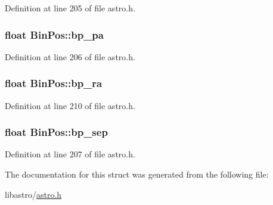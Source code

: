 Definition at line 205 of file astro.\-h.

\hypertarget{struct_bin_pos_a5a2e7d4cb399601758b0c724ce5543d4}{
\subsubsection[{bp\-\_\-pa}]{\setlength{\rightskip}{0pt plus 5cm}float Bin\-Pos\-::bp\-\_\-pa}}\label{struct_bin_pos_a5a2e7d4cb399601758b0c724ce5543d4}


Definition at line 206 of file astro.\-h.

\hypertarget{struct_bin_pos_addd6fc5c935d61f90723a4848e70c86f}{
\subsubsection[{bp\-\_\-ra}]{\setlength{\rightskip}{0pt plus 5cm}float Bin\-Pos\-::bp\-\_\-ra}}\label{struct_bin_pos_addd6fc5c935d61f90723a4848e70c86f}


Definition at line 210 of file astro.\-h.

\hypertarget{struct_bin_pos_aa451101e51c051196ee5cc0f6d846f77}{
\subsubsection[{bp\-\_\-sep}]{\setlength{\rightskip}{0pt plus 5cm}float Bin\-Pos\-::bp\-\_\-sep}}\label{struct_bin_pos_aa451101e51c051196ee5cc0f6d846f77}


Definition at line 207 of file astro.\-h.



The documentation for this struct was generated from the following file\-:\begin{DoxyCompactItemize}
\item 
libastro/\hyperlink{astro_8h}{astro.\-h}\end{DoxyCompactItemize}
